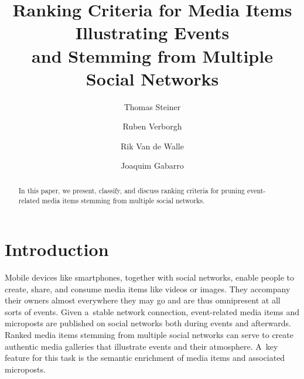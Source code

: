 \documentclass[runningheads,a4paper,11pt]{llncs}
\begin{document}
\mainmatter

\title{Ranking Criteria for Media Items Illustrating Events\\ and Stemming from Multiple Social Networks}

\renewcommand{\ttdefault}{pcr}
\renewcommand\UrlFont{\smaller\tt}

\author{Thomas Steiner \and Ruben Verborgh \and Rik Van de Walle \and Joaquim Gabarro}



\maketitle

\begin{abstract}
In this paper, we present, classify, and discuss ranking criteria for
pruning event-related media items stemming from multiple social networks.
\end{abstract}

\section{Introduction}
Mobile devices like smartphones, together with social networks,
enable people to create, share, and consume media items
like videos or images.
They accompany their owners almost everywhere they may go
and are thus omnipresent at all sorts of events.
Given a~stable network connection, event-related media items and microposts are published
on social networks both during events and afterwards.
Ranked media items stemming from multiple social networks
can serve to create authentic media galleries
that illustrate events and their atmosphere.
A~key feature for this task is the semantic enrichment of media items and associated microposts.
\end{document}
